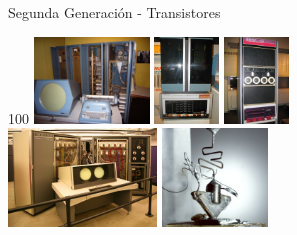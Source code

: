 \documentclass[aspectratio=169]{beamer}
\begin{document}
\begin{frame}[fragile,t]{Segunda Generación - Transistores}
\begin{textblock}{100}
    \includegraphics[height=2.3cm]{img/PDP-1.jpg} \hspace{0.1cm} \includegraphics[height=2.3cm]{img/PDP-8.jpg}  \hspace{0.1cm} \includegraphics[height=2.3cm]{img/PDP-11.jpg}\\
    \vspace{0.1cm}
    \includegraphics[height=2.63cm]{img/CDC6600.jpg} \hspace{0.1cm} \includegraphics[height=2.63cm]{img/transistor.jpg}\\
    \end{textblock}
\end{frame}
\end{document}
